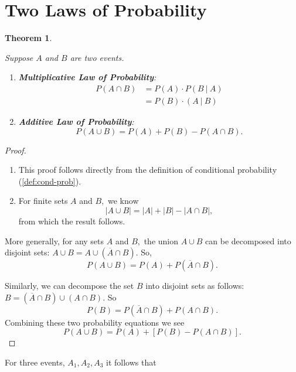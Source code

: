 \documentclass[
]{book}
\newtheorem{theorem}{Theorem}[chapter]
\theoremstyle{definition}
\theoremstyle{definition}
\theoremstyle{definition}
\theoremstyle{definition}
\theoremstyle{remark}
\begin{document}
\section{Two Laws of Probability}\label{two-laws-of-probability}

\begin{theorem}
\protect\hypertarget{thm:two-prob-laws}{}\label{thm:two-prob-laws}

Suppose \(A\) and \(B\) are two events.

\begin{enumerate}
\def\labelenumi{\arabic{enumi}.}
\item
  \textbf{Multiplicative Law of Probability}:
  \begin{align*}
    P(A \cap B) &= P(A)\cdot P(B~|~A) \\
             &= P(B) \cdot (A~|~B) 
    \end{align*}
\item
  \textbf{Additive Law of Probability}:
  \[P(A\cup B) = P(A) + P(B) - P(A \cap B).\]
\end{enumerate}

\end{theorem}

\begin{proof}
\leavevmode

\begin{enumerate}
\def\labelenumi{\arabic{enumi}.}
\item
  This proof follows directly from the definition of conditional probability (\ref{def:cond-prob}).
\item
  For finite sets \(A\) and \(B,\) we know \[|A \cup B| = |A| + |B| - |A \cap B|,\] from which the result follows.
\end{enumerate}

More generally, for any sets \(A\) and \(B,\) the union \(A \cup B\) can be decomposed into disjoint sets: \(A \cup B = A \cup (\overline{A} \cap B).\)
So, \[P(A \cup B) = P(A) + P(\overline{A} \cap B).\]

Similarly, we can decompose the set \(B\) into disjoint sets as follows: \(B = (\overline{A} \cap B) \cup (A \cap B).\)
So \[P(B) = P(\overline{A}\cap B) + P(A \cap B).\]
Combining these two probability equations we see \[P(A \cup B) = P(A) + \left[P(B)-P(A\cap B)\right].\]

\end{proof}

For three events, \(A_1, A_2, A_3\) it follows that
\end{document}
